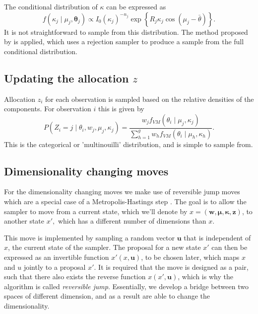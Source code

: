 The conditional distribution of $\kappa$ can be expressed as
\begin{equation}
f(\kappa_j \mid \mu_j, \bm{\theta}_j) \propto {I_0(\kappa_j)}^{-n_j} \exp\left\{R_{j} \kappa_j \cos\left(\mu_j - \bar{\theta}\right)\right\}.
\end{equation}
It is not straightforward to sample from this distribution. The method proposed by \citet{Forbes:2014ju} is applied, which uses a rejection sampler to produce a sample from the full conditional distribution.

\subsection{Updating the allocation $z$}
Allocation $z_i$ for each observation is sampled based on the relative densities of the components. For observation $i$ this is given by
\begin{equation}
P(Z_i = j \mid \theta_i, w_j, \mu_j, \kappa_j) = \frac{w_j f_{VM}(\theta_i \mid \mu_j, \kappa_j)}{\sum^g_{h=1} w_h f_{VM}(\theta_i \mid \mu_h, \kappa_h)}.
\end{equation}
This is the categorical or 'multinouilli' distribution, and is simple to sample from.

\subsection{Dimensionality changing moves}
For the dimensionality changing moves we make use of reversible jump moves which are a special case of a Metropolis-Hastings step \citep{Richardson:1997di}. The goal is to allow the sampler to move from a current state, which we'll denote by $x = (\bm w, \bm \mu, \bm \kappa, \bm z)$, to another state $x',$ which has a different number of dimensions than $x$. 


This move is implemented by sampling a random vector $\bm u$ that is independent of $x$, the current state of the sampler. The proposal for a new state $x'$ can then be expressed as an invertible function $x'(x, \bm u)$, to be chosen later, which maps $x$ and $u$ jointly to a proposal $x'$. It is required that the move is designed as a pair, such that there also exists the reverse function $x(x', \bm u)$, which is why the algorithm is called \textit{reversible jump}. Essentially, we develop a bridge between two spaces of different dimension, and as a result are able to change the dimensionality.

